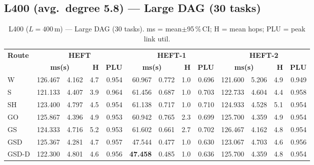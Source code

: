 \documentclass[11pt]{article}
\newcommand{\win}[1]{\textcolor{green!50!black}{\textbf{#1}}}
\newcommand{\bad}[1]{\textcolor{red!70!black}{#1}}
\begin{document}
\subsection{L400 (avg.\ degree 5.8) --- Large DAG (30 tasks)}
\begin{table}[H]\centering\small
\begin{tabular}{l r@{$\pm$}l r r r@{$\pm$}l r r r@{$\pm$}l r r}
\toprule
\textbf{Route} & \multicolumn{4}{c}{\textbf{HEFT}} & \multicolumn{4}{c}{\textbf{HEFT-1}} & \multicolumn{4}{c}{\textbf{HEFT-2}} \\
\cmidrule(lr){2-5}\cmidrule(lr){6-9}\cmidrule(lr){10-13}
& \multicolumn{2}{c}{\textbf{ms(s)}} & \textbf{H} & \textbf{PLU}& \multicolumn{2}{c}{\textbf{ms(s)}} & \textbf{H} & \textbf{PLU}& \multicolumn{2}{c}{\textbf{ms(s)}} & \textbf{H} & \textbf{PLU} \\
\midrule
  W & \bad{126.467} & 4.162 & 4.7 & 0.954 & 60.967 & 0.772 & 1.0 & 0.696 & 121.600 & 5.206 & 4.9 & 0.949 \\
  S & 121.133 & 4.407 & 3.9 & 0.964 & 61.456 & 0.687 & 1.0 & 0.703 & 122.733 & 4.604 & 4.4 & 0.958 \\
  SH & 123.400 & 4.797 & 4.5 & 0.954 & 61.138 & 0.717 & 1.0 & 0.710 & 124.933 & 4.528 & 5.1 & 0.954 \\
  GO & 125.867 & 4.396 & 4.9 & 0.953 & 60.942 & 0.765 & 2.3 & 0.699 & 125.700 & 4.359 & 4.9 & 0.954 \\
  GS & 124.333 & 4.716 & 5.2 & 0.953 & \bad{61.602} & 0.661 & 2.7 & 0.702 & \bad{126.467} & 4.162 & 4.8 & 0.954 \\
  GSD & 125.367 & 4.281 & 4.7 & 0.957 & 47.544 & 0.477 & 1.0 & 0.630 & 123.067 & 4.703 & 4.6 & 0.956 \\
  GSD-D & 122.300 & 4.801 & 4.6 & 0.956 & \win{47.458} & 0.485 & 1.0 & 0.636 & 125.700 & 4.359 & 4.8 & 0.954 \\
\bottomrule\end{tabular}
\caption{L400 ($L=400$\,m) --- Large DAG (30 tasks). ms = mean$\pm$95\,\%\,CI; H = mean hops; PLU = peak link util.}
\end{table}
\end{document}
